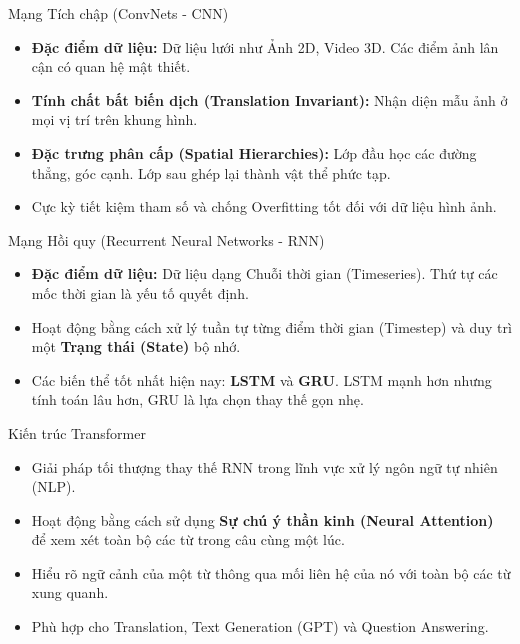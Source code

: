 \documentclass[aspectratio=169]{beamer}
\begin{document}
\begin{frame}{Mạng Tích chập (ConvNets - CNN)}
    \begin{itemize}
        \item \textbf{Đặc điểm dữ liệu:} Dữ liệu lưới như Ảnh 2D, Video 3D. Các điểm ảnh lân cận có quan hệ mật thiết.
        \item \textbf{Tính chất bất biến dịch (Translation Invariant):} Nhận diện mẫu ảnh ở mọi vị trí trên khung hình.
        \item \textbf{Đặc trưng phân cấp (Spatial Hierarchies):} Lớp đầu học các đường thẳng, góc cạnh. Lớp sau ghép lại thành vật thể phức tạp.
        \item Cực kỳ tiết kiệm tham số và chống Overfitting tốt đối với dữ liệu hình ảnh.
    \end{itemize}
\end{frame}

\begin{frame}{Mạng Hồi quy (Recurrent Neural Networks - RNN)}
    \begin{itemize}
        \item \textbf{Đặc điểm dữ liệu:} Dữ liệu dạng Chuỗi thời gian (Timeseries). Thứ tự các mốc thời gian là yếu tố quyết định.
        \item Hoạt động bằng cách xử lý tuần tự từng điểm thời gian (Timestep) và duy trì một \textbf{Trạng thái (State)} bộ nhớ.
        \item Các biến thể tốt nhất hiện nay: \textbf{LSTM} và \textbf{GRU}. LSTM mạnh hơn nhưng tính toán lâu hơn, GRU là lựa chọn thay thế gọn nhẹ.
    \end{itemize}
\end{frame}

\begin{frame}{Kiến trúc Transformer}
    \begin{itemize}
        \item Giải pháp tối thượng thay thế RNN trong lĩnh vực xử lý ngôn ngữ tự nhiên (NLP).
        \item Hoạt động bằng cách sử dụng \textbf{Sự chú ý thần kinh (Neural Attention)} để xem xét toàn bộ các từ trong câu cùng một lúc.
        \item Hiểu rõ ngữ cảnh của một từ thông qua mối liên hệ của nó với toàn bộ các từ xung quanh.
        \item Phù hợp cho Translation, Text Generation (GPT) và Question Answering.
    \end{itemize}
\end{frame}
\end{document}
